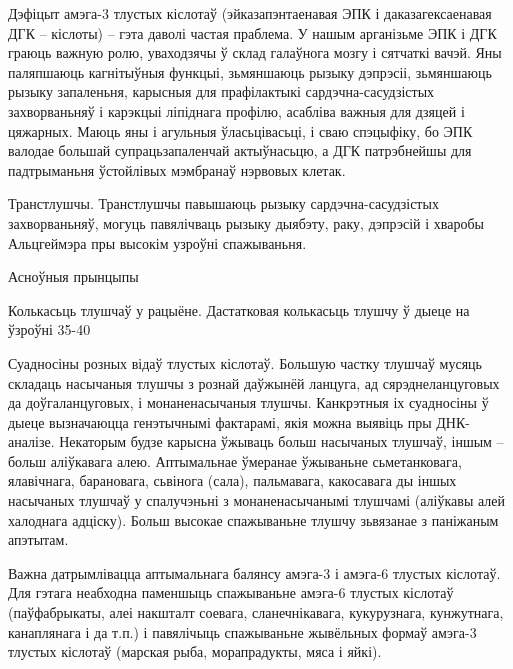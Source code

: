 Дэфіцыт амэга-3 тлустых кіслотаў (эйказапэнтаенавая ЭПК і даказагексаенавая ДГК – кіслоты) – гэта даволі частая праблема.
У нашым арганізьме ЭПК і ДГК граюць важную ролю, уваходзячы ў склад галаўнога мозгу і сятчаткі вачэй. Яны паляпшаюць кагнітыўныя функцыі, зьмяншаюць рызыку дэпрэсіі, зьмяншаюць рызыку запаленьня, карысныя для прафілактыкі сардэчна-сасудзістых захворваньняў і карэкцыі ліпіднага профілю, асабліва важныя для дзяцей і цяжарных. Маюць яны і агульныя ўласьцівасьці, і сваю спэцыфіку, бо ЭПК валодае большай супрацьзапаленчай актыўнасьцю, а ДГК патрэбнейшы для падтрыманьня ўстойлівых мэмбранаў нэрвовых клетак.

Транстлушчы.
Транстлушчы павышаюць рызыку сардэчна-сасудзістых захворваньняў, могуць павялічваць рызыку дыябэту, раку, дэпрэсій і хваробы Альцгеймэра пры высокім узроўні спажываньня.

Асноўныя прынцыпы

Колькасьць тлушчаў у рацыёне.
Дастатковая колькасьць тлушчу ў дыеце на ўзроўні 35-40%

Суадносіны розных відаў тлустых кіслотаў.
Большую частку тлушчаў мусяць складаць насычаныя тлушчы з рознай даўжынёй ланцуга, ад сярэднеланцуговых да доўгаланцуговых, і монаненасычаныя тлушчы. Канкрэтныя іх суадносіны ў дыеце вызначаюцца генэтычнымі фактарамі, якія можна выявіць пры ДНК-аналізе. Некаторым будзе карысна ўжываць больш насычаных тлушчаў, іншым – больш аліўкавага алею. Аптымальнае ўмеранае ўжываньне сьметанковага, ялавічнага, барановага, сьвінога (сала), пальмавага, какосавага ды іншых насычаных тлушчаў у спалучэньні з монаненасычанымі тлушчамі (аліўкавы алей халоднага адціску). Больш высокае спажываньне тлушчу зьвязанае з паніжаным апэтытам.

Важна датрымлівацца аптымальнага балянсу амэга-3 і амэга-6 тлустых кіслотаў. Для гэтага неабходна паменшыць спажываньне амэга-6 тлустых кіслотаў (паўфабрыкаты, алеі накшталт соевага, сланечнікавага, кукурузнага, кунжутнага, канаплянага і да т.п.) і павялічыць спажываньне жывёльных формаў амэга-3 тлустых кіслотаў (марская рыба, морапрадукты, мяса і яйкі).

